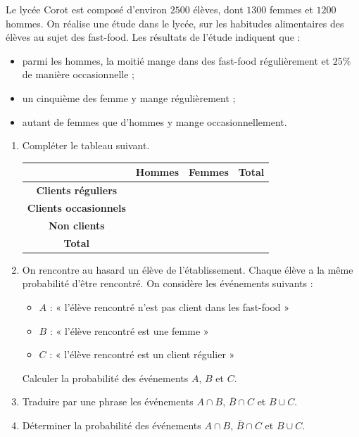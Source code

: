 \documentclass[11pt]{article}
\begin{document}
\begin{app}
  Le lycée Corot est composé d'environ $2500$ élèves, dont $1300$ femmes et
  $1200$ hommes. On réalise une étude dans le lycée, sur les habitudes
  alimentaires des élèves au sujet des fast-food. Les résultats de l'étude
  indiquent que :
  \begin{itemize}
    \item parmi les hommes, la moitié mange dans des fast-food régulièrement et
      $25$\% de manière occasionnelle ;
    \item un cinquième des femme y mange régulièrement ;
    \item autant de femmes que d'hommes y mange occasionnellement.
  \end{itemize}
\begin{enumerate}
  \item Compléter le tableau suivant.\\[-13mm]
\begin{center}
\renewcommand{\arraystretch}{1.5}
\begin{tabular}{|c|c|c|c|}
  \cline{2-4}
  \multicolumn{1}{c|}{} & \textbf{Hommes} & \textbf{Femmes} &
  \textbf{\quad Total\quad} \\
  \hline
  \textbf{Clients réguliers} & & & \\
  \hline
  \textbf{Clients occasionnels} & & & \\
  \hline
  \textbf{Non clients} & & & \\
  \hline
  \textbf{Total} & & &  \\
  \hline
\end{tabular}
\end{center}
  \item On rencontre au hasard un élève de l'établissement. Chaque élève a la
    même probabilité d'être rencontré. On considère les événements suivants :
    \begin{itemize}
      \item $A$ : « l'élève rencontré n'est pas client dans les fast-food »
      \item $B$ : « l'élève rencontré est une femme »
      \item $C$ : « l'élève rencontré est un client régulier »
    \end{itemize}
    Calculer la probabilité des événements $A$, $B$ et $C$.
  \item Traduire par une phrase les événements $A\cap B$, $\overline B\cap C$
    et $B\cup C$.
  \item Déterminer la probabilité des événements $A\cap B$, $\overline B\cap C$
    et $B\cup C$.
\end{enumerate}
\end{app}
\end{document}
